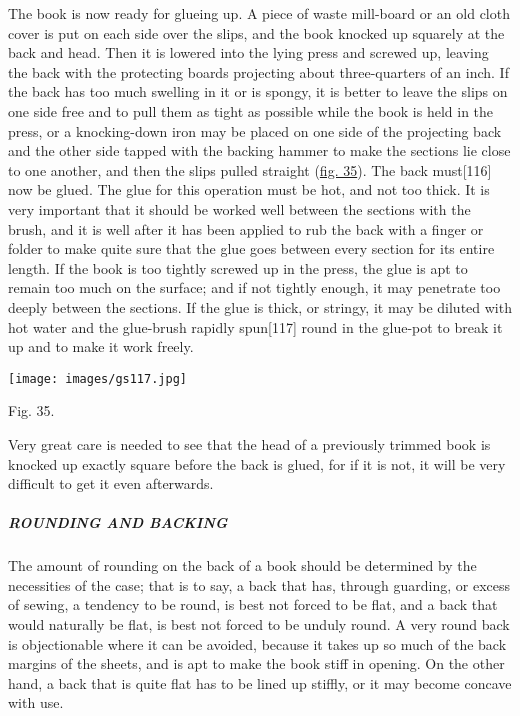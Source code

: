 \documentclass[
]{article}
\begin{document}
The book is now ready for glueing up. A piece of waste mill-board or an
old cloth cover is put on each side over the slips, and the book knocked
up squarely at the back and head. Then it is lowered into the lying
press and screwed up, leaving the back with the protecting boards
projecting about three-quarters of an inch. If the back has too much
swelling in it or is spongy, it is better to leave the slips on one side
free and to pull them as tight as possible while the book is held in the
press, or a knocking-down iron may be placed on one side of the
projecting back and the other side tapped with the backing hammer to
make the sections lie close to one another, and then the slips pulled
straight (\protect\hyperlink{Fig_35}{fig. 35}). The back
must{\protect\hypertarget{Page_116}{}{{[}116{]}}} now be glued. The glue
for this operation must be hot, and not too thick. It is very important
that it should be worked well between the sections with the brush, and
it is well after it has been applied to rub the back with a finger or
folder to make quite sure that the glue goes between every section for
its entire length. If the book is too tightly screwed up in the press,
the glue is apt to remain too much on the surface; and if not tightly
enough, it may penetrate too deeply between the sections. If the glue is
thick, or stringy, it may be diluted with hot water and the glue-brush
rapidly spun{\protect\hypertarget{Page_117}{}{{[}117{]}}} round in the
glue-pot to break it up and to make it work freely.

\protect\hypertarget{Fig_35}{}{}
\texttt{[image: images/gs117.jpg]}

Fig. 35.

Very great care is needed to see that the head of a previously trimmed
book is knocked up exactly square before the back is glued, for if it is
not, it will be very difficult to get it even afterwards.

\hypertarget{rounding-and-backing}{%
\subparagraph{ROUNDING AND BACKING}\label{rounding-and-backing}}

The amount of rounding on the back of a book should be determined by the
necessities of the case; that is to say, a back that has, through
guarding, or excess of sewing, a tendency to be round, is best not
forced to be flat, and a back that would naturally be flat, is best not
forced to be unduly round. A very round back is objectionable where it
can be avoided, because it takes up so much of the back margins of the
sheets, and is apt to make the book stiff in opening. On the other hand,
a back that is quite flat has to be lined up stiffly, or it may become
concave with use.
\end{document}

